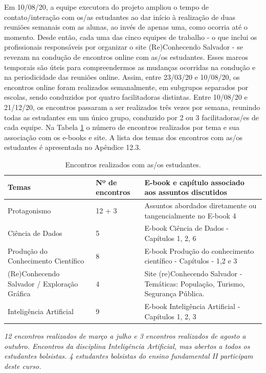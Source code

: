 \documentclass[
]{book}
\begin{document}
Em 10/08/20, a equipe executora do projeto ampliou o tempo de contato/interação com os/as estudantes ao dar início à realização de duas reuniões semanais com as alunas, ao invés de apenas uma, como ocorria até o momento. Desde então, cada uma das cinco equipes de trabalho - o que inclui os profissionais responsáveis por organizar o site (Re)Conhecendo Salvador - se revezam na condução de encontros online com as/os estudantes.
Esses marcos temporais são úteis para compreendermos as mudanças ocorridas na condução e na periodicidade das reuniões online. Assim, entre 23/03/20 e 10/08/20, os encontros online foram realizados semanalmente, em subgrupos separados por escolas, sendo conduzidos por quatro facilitadoras distintas. Entre 10/08/20 e 21/12/20, os encontros passaram a ser realizados três vezes por semana, reunindo todas as estudantes em um único grupo, conduzido por 2 ou 3 facilitadoras/es de cada equipe. Na Tabela \ref{tab:quadro3} o número de encontros realizados por tema e sua associação com os e-books e site. A lista dos temas dos encontros com as/os estudantes é apresentada no Apêndice 12.3.

\begin{table}

\caption{\label{tab:quadro3}Encontros realizados com as/os estudantes.}
\centering
\begin{tabular}[t]{l|l|l}
\hline
Temas & Nº de encontros & E-book e capítulo associado aos assuntos discutidos\\
\hline
Protagonismo & 12 + 3 & Assuntos abordados diretamente ou tangencialmente no E-book 4\\
\hline
Ciência de Dados & 5 & E-book Ciência de Dados - Capítulos 1, 2, 6\\
\hline
Produção do Conhecimento Científico & 8 & E-book Produção do conhecimento científico - Capítulos - 1,2 e 3\\
\hline
(Re)Conhecendo Salvador / Exploração Gráfica & 4 & Site (re)Conhecendo Salvador - Temáticas: População, Turismo, Segurança Pública.\\
\hline
Inteligência Artificial & 9 & E-book Inteligência Artificial - Capítulos 1, 2, 3\\
\hline
\end{tabular}
\end{table}

\emph{12 encontros realizados de março a julho e 3 encontros realizados de agosto a outubro. Encontros da disciplina Inteligência Artificial, mas abertos a todos os estudantes bolsistas. 4 estudantes bolsistas do ensino fundamental II participam deste curso.}
\end{document}
